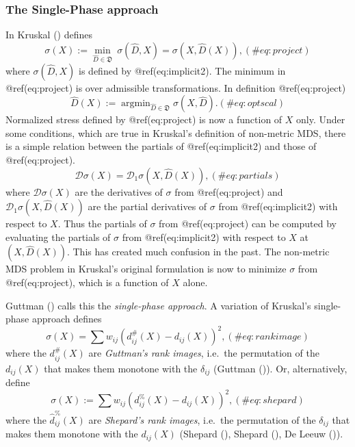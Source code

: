 \documentclass[
  12pt,
  letterpaper,
  DIV=11,
  numbers=noendperiod]{scrartcl}
\begin{document}
\subsubsection{The Single-Phase
approach}\label{the-single-phase-approach}

In Kruskal () defines \begin{equation}
\sigma(X):=\min_{\hat D\in\mathfrak{D}}\ \sigma(\hat D,X)=\sigma(X,\hat D(X)),
(\#eq:project)
\end{equation} where \(\sigma(\hat D,X)\) is defined by
@ref(eq:implicit2). The minimum in @ref(eq:project) is over admissible
transformations. In definition @ref(eq:project) \begin{equation}
\hat D(X):=\mathop{\text{argmin}}_{\hat D\in\mathfrak{D}}\sigma(X, \hat D).
(\#eq:optscal)
\end{equation} Normalized stress defined by @ref(eq:project) is now a
function of \(X\) only. Under some conditions, which are true in
Kruskal's definition of non-metric MDS, there is a simple relation
between the partials of @ref(eq:implicit2) and those of
@ref(eq:project). \begin{equation}
\mathcal{D}\sigma(X)=\mathcal{D}_1\sigma(X,\hat D(X)),
(\#eq:partials)
\end{equation} where \(\mathcal{D}\sigma(X)\) are the derivatives of
\(\sigma\) from @ref(eq:project) and
\(\mathcal{D}_1\sigma(X,\hat D(X))\) are the partial derivatives of
\(\sigma\) from @ref(eq:implicit2) with respect to \(X\). Thus the
partials of \(\sigma\) from @ref(eq:project) can be computed by
evaluating the partials of \(\sigma\) from @ref(eq:implicit2) with
respect to \(X\) at \((X,\hat D(X))\). This has created much confusion
in the past. The non-metric MDS problem in Kruskal's original
formulation is now to minimize \(\sigma\) from @ref(eq:project), which
is a function of \(X\) alone.

Guttman () calls this the
\emph{single-phase approach}. A variation of Kruskal's single-phase
approach defines \begin{equation}
\sigma(X)=\sum w_{ij}(d_{ij}^\#(X)-d_{ij}(X))^2,
(\#eq:rankimage)
\end{equation} where the \(d_{ij}^\#(X)\) are \emph{Guttman's rank
images}, i.e.~the permutation of the \(d_{ij}(X)\) that makes them
monotone with the \(\delta_{ij}\) (Guttman
()). Or, alternatively, define
\begin{equation}
\sigma(X):=\sum   w_{ij}(d_{ij}^\%(X)-d_{ij}(X))^2,
(\#eq:shepard)
\end{equation} where the \(\hat d_{ij}^\%(X)\) are \emph{Shepard's rank
images}, i.e.~the permutation of the \(\delta_{ij}\) that makes them
monotone with the \(d_{ij}(X)\) (Shepard
(), Shepard
(), De Leeuw
()).
\end{document}
